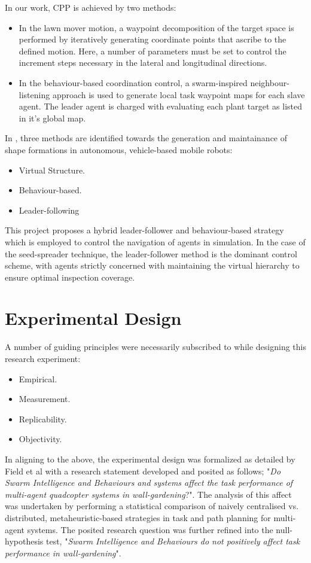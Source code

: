 \documentclass{report}
\begin{document}
In our work, CPP is achieved by two methods:
\begin{itemize}
	\item In the lawn mover motion, a waypoint decomposition of the target space is performed by iteratively generating coordinate points that ascribe to the defined motion. Here, a number of parameters must be set to control the increment steps necessary in the lateral and longitudinal directions.
	\item In the behaviour-based coordination control, a swarm-inspired neighbour-listening approach is used to generate local task waypoint maps for each slave agent. The leader agent is charged with evaluating each plant target as listed in it’s global map.
\end{itemize}

In \cite{Macas2009}, three methods are identified towards the generation and maintainance of shape formations in autonomous, vehicle-based mobile robots:
\begin{itemize}
	\item Virtual Structure.
	\item Behaviour-based.
	\item Leader-following
\end{itemize}
This project proposes a hybrid leader-follower and behaviour-based strategy which is employed to control the navigation of agents in simulation. In the case of the seed-spreader technique, the leader-follower method is the dominant control scheme, with agents strictly concerned with maintaining the virtual hierarchy to ensure optimal inspection coverage.

\section{Experimental Design}
A number of guiding principles \cite{Field2012} were necessarily subscribed to while designing this research experiment:
\begin{itemize}
	\item Empirical.
	\item Measurement.
	\item Replicability.
	\item Objectivity.
\end{itemize}

In aligning to the above, the experimental design was formalized as detailed by Field et al \cite{Field2012} with a research statement developed and posited as follows; "\textit{Do Swarm Intelligence and Behaviours and systems affect the task performance of multi-agent quadcopter systems in wall-gardening}?". The analysis of this affect was undertaken by performing a statistical comparison of naively centralised vs. distributed, metaheuristic-based strategies in task and path planning for multi-agent systems. The posited research question was further refined into the null-hypothesis test, "\textit{Swarm Intelligence and Behaviours do not positively affect task performance in wall-gardening}".
\end{document}
